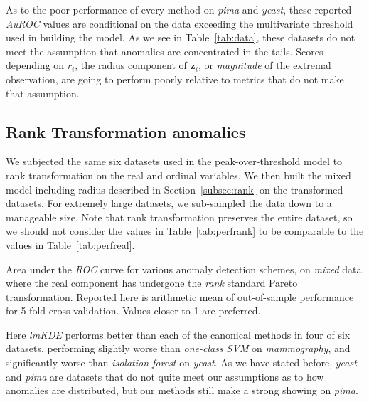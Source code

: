 As to the poor performance of every method on \emph{pima} and \emph{yeast}, 
    these reported \emph{AuROC} values are conditional on the data exceeding 
    the multivariate threshold used in building the model.  As we see in 
    Table~\ref{tab:data}, these datasets do not meet the assumption that 
    anomalies are concentrated in the tails.  Scores depending on $r_i$, the
    radius component of $\bm{z}_i$, or \emph{magnitude} of the extremal 
    observation, are going to perform poorly relative to metrics that do not 
    make that assumption.

\subsection{Rank Transformation anomalies}
We subjected the same six datasets used in the peak-over-threshold model to 
    rank transformation on the real and ordinal variables. We then built the 
    mixed model including radius described in Section~\ref{subsec:rank} on the 
    transformed datasets.  For extremely large datasets, we sub-sampled the 
    data down to a manageable size.
    Note that rank transformation preserves the entire dataset, so we should 
    not consider the values in Table~\ref{tab:perfrank} to be comparable to 
    the values in Table~\ref{tab:perfreal}.
    
\begin{table}[ht]
    \centering
    \caption{Area under the \emph{ROC} curve for various anomaly detection 
        schemes, on \emph{mixed} data where the real component has undergone 
        the \emph{rank} standard Pareto transformation. Reported here is 
        arithmetic mean of out-of-sample performance for 5-fold 
        cross-validation.  Values closer to 1 are preferred.
        \label{tab:perfrank}}
    \bigskip
    
\end{table}

Here \emph{lmKDE} performs better than each of the canonical methods in four of 
    six datasets, performing slightly worse than \emph{one-class SVM} on 
    \emph{mammography}, and significantly worse than \emph{isolation forest} on 
    \emph{yeast}.  As we have stated before, \emph{yeast} and \emph{pima} are 
    datasets that do not quite meet our assumptions as to how anomalies are 
    distributed, but our methods still make a strong showing on \emph{pima}.
    

